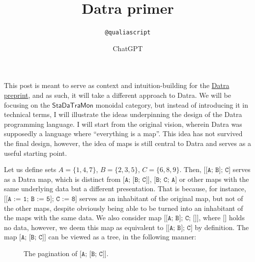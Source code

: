 \documentclass[11pt]{article}
\title{Datra primer}
\author{\texttt{@qualiascript} \and ChatGPT}
\date{}
\newcommand{\code}[1]{\texttt{#1}}
\newcommand{\StaDaTraMon}{\mathsf{StaDaTraMon}}
\begin{document}
\maketitle

This post is meant to serve as context and intuition-building for the
\href{run:datra_preprint.pdf}{Datra preprint}, and as such, it will take a
different approach to Datra. We will be focusing on the
\(\StaDaTraMon\) monoidal category, but instead of introducing it in
technical terms, I will illustrate the ideas underpinning the design of the
Datra programming language. I will start from the original vision, wherein
Datra was supposedly a language where ``everything is a map''. This idea has
not survived the final design, however, the idea of maps is still central to
Datra and serves as a useful starting point.

Let us define sets \(A = \{1, 4, 7\}\), \(B = \{2, 3, 5\}\),
\(C = \{6, 8, 9\}\). Then, \(\code{[[A; B]; C]}\) serves as a Datra map,
which is distinct from \(\code{[A; [B; C]]}\), \(\code{[B; C; A]}\) or
other maps with the same underlying data but a different presentation. That
is because, for instance, \(\code{[[A := 1; B := 5]; C := 8]}\) serves as
an inhabitant of the original map, but not of the other maps, despite
obviously being able to be turned into an inhabitant of the maps with the
same data. We also consider map \(\code{[[A; B]; C; []]}\), where
\(\code{[]}\) holds no data, however, we deem this map as equivalent to
\(\code{[[A; B]; C]}\) by definition. The map \(\code{[A; [B; C]]}\) can
be viewed as a tree, in the following manner:

\begin{figure}[htbp]
\centering
{}
\caption{The pagination of \(\code{[A; [B; C]]}\).}
\label{fig:pagination}
\end{figure}
\end{document}
